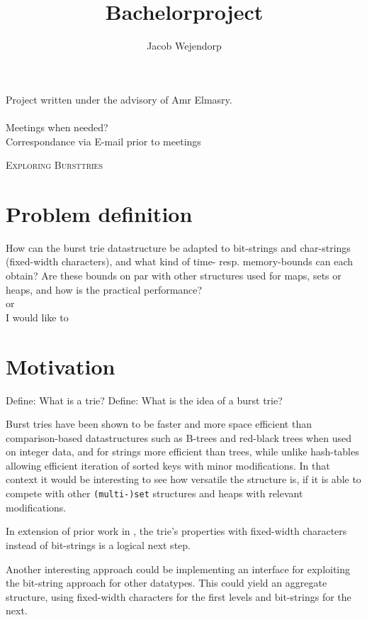 \documentclass{article}
\title{Bachelorproject\\\projecttitle}
\author{Jacob Wejendorp}
\newcommand{\projecttitle}{Exploring Bursttries}
\newcommand{\bigname}[1]{
        \begin{center}\fontfamily{phv}\selectfont\large\scshape#1\end{center}
}
\begin{document}
\maketitle
Project written under the advisory of Amr Elmasry.\\\\

Meetings when needed?\\
Correspondance via E-mail prior to meetings
\newpage



\bigname{\projecttitle}

\section*{Problem definition}
How can the burst trie datastructure be adapted to bit-strings and char-strings
(fixed-width characters), and what kind of time- resp. memory-bounds can each obtain?
Are these bounds on par with other structures used for maps, sets or heaps, and
how is the practical performance?
\\or\\
I would like to 



\section*{Motivation}
Define: What is a trie?
Define: What is the idea of a burst trie?


Burst tries have been shown to be faster and more space efficient than
comparison-based datastructures such as B-trees and red-black trees
when used on integer data\cite{Nash2008}, and for strings more efficient than trees,
while unlike hash-tables allowing efficient iteration of sorted keys with
minor modifications.\cite{wejendorpgrathwohl2010}
In that context it would be interesting to see how versatile the structure is,
if it is able to compete with other {\tt (multi-)set} structures and heaps with
relevant modifications.

In extension of prior work in \cite{wejendorpgrathwohl2010}, the trie's properties
with fixed-width characters instead of bit-strings is a logical next step.

Another interesting approach could be implementing an interface for exploiting 
the bit-string approach for other datatypes. This could yield an aggregate structure,
using fixed-width characters for the first levels and bit-strings for the next.
\end{document}
